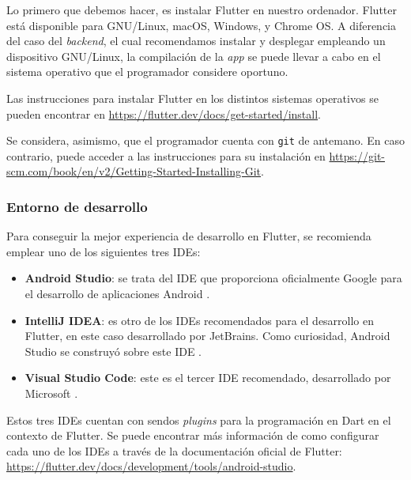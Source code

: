 Lo primero que debemos hacer, es instalar Flutter en nuestro ordenador. Flutter está disponible para GNU/Linux, macOS, Windows, y Chrome OS. A diferencia del caso del \emph{backend}, el cual recomendamos instalar y desplegar empleando un dispositivo GNU/Linux, la compilación de la \emph{app} se puede llevar a cabo en el sistema operativo que el programador considere oportuno.

Las instrucciones para instalar Flutter en los distintos sistemas operativos se pueden encontrar en \href{https://flutter.dev/docs/get-started/install}{https://flutter.dev/docs/get-started/install}.

Se considera, asimismo, que el programador cuenta con \texttt{git} de antemano. En caso contrario, puede acceder a las instrucciones para su instalación en \href{https://git-scm.com/book/en/v2/Getting-Started-Installing-Git}{https://git-scm.com/book/en/v2/Getting-Started-Installing-Git}.

\subsubsection{Entorno de desarrollo}

Para conseguir la mejor experiencia de desarrollo en Flutter, se recomienda emplear uno de los siguientes tres IDEs:

\vspace{-0.2cm}
\begin{itemize} [\textbullet]
	\item \textbf{Android Studio}: se trata del IDE que proporciona oficialmente Google para el desarrollo de aplicaciones Android \cite{android-studio}.
	
	\item \textbf{IntelliJ IDEA}: es otro de los IDEs recomendados para el desarrollo en Flutter, en este caso desarrollado por JetBrains. Como curiosidad, Android Studio se construyó sobre este IDE \cite{intellij}.
	
	\item \textbf{Visual Studio Code}: este es el tercer IDE recomendado, desarrollado por Microsoft \cite{visual-code}.
\end{itemize}

Estos tres IDEs cuentan con sendos \emph{plugins} para la programación en Dart en el contexto de Flutter. Se puede encontrar más información de como configurar cada uno de los IDEs a través de la documentación oficial de Flutter: \href{https://flutter.dev/docs/development/tools/android-studio}{https://flutter.dev/docs/development/tools/android-studio}.


